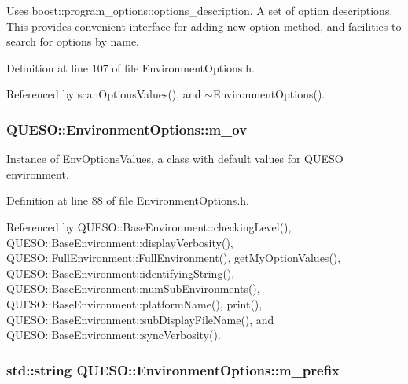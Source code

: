Uses boost\-::program\-\_\-options\-::options\-\_\-description. A set of option descriptions. This provides convenient interface for adding new option method, and facilities to search for options by name. 

Definition at line 107 of file Environment\-Options.\-h.



Referenced by scan\-Options\-Values(), and $\sim$\-Environment\-Options().

\hypertarget{class_q_u_e_s_o_1_1_environment_options_a97de0e8029b2d567643ab2b1b6ba2b9c}{
\subsubsection[{m\-\_\-ov}]{ Q\-U\-E\-S\-O\-::\-Environment\-Options\-::m\-\_\-ov}}\label{class_q_u_e_s_o_1_1_environment_options_a97de0e8029b2d567643ab2b1b6ba2b9c}


Instance of \hyperlink{class_q_u_e_s_o_1_1_env_options_values}{Env\-Options\-Values}, a class with default values for \hyperlink{namespace_q_u_e_s_o}{Q\-U\-E\-S\-O} environment. 



Definition at line 88 of file Environment\-Options.\-h.



Referenced by Q\-U\-E\-S\-O\-::\-Base\-Environment\-::checking\-Level(), Q\-U\-E\-S\-O\-::\-Base\-Environment\-::display\-Verbosity(), Q\-U\-E\-S\-O\-::\-Full\-Environment\-::\-Full\-Environment(), get\-My\-Option\-Values(), Q\-U\-E\-S\-O\-::\-Base\-Environment\-::identifying\-String(), Q\-U\-E\-S\-O\-::\-Base\-Environment\-::num\-Sub\-Environments(), Q\-U\-E\-S\-O\-::\-Base\-Environment\-::platform\-Name(), print(), Q\-U\-E\-S\-O\-::\-Base\-Environment\-::sub\-Display\-File\-Name(), and Q\-U\-E\-S\-O\-::\-Base\-Environment\-::sync\-Verbosity().

\hypertarget{class_q_u_e_s_o_1_1_environment_options_aca57a4ae24af2c2d1437f6a4d51de6a6}{
\subsubsection[{m\-\_\-prefix}]{\setlength{\rightskip}{0pt plus 5cm}std\-::string Q\-U\-E\-S\-O\-::\-Environment\-Options\-::m\-\_\-prefix\hspace{0.3cm}{\ttfamily [private]}}}\label{class_q_u_e_s_o_1_1_environment_options_aca57a4ae24af2c2d1437f6a4d51de6a6}


